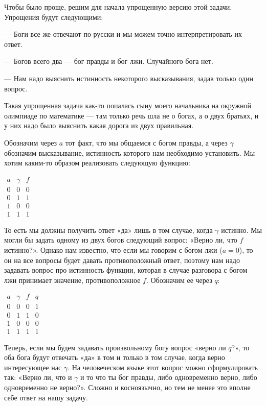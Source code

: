 Чтобы было проще, решим для начала упрощенную версию этой задачи. Упрощения будут следующими:

— Боги все же отвечают по-русски и мы можем точно интерпретировать их ответ.

— Богов всего два — бог правды и бог лжи. Случайного бога нет.

— Нам надо выяснить истинность некоторого высказывания, задав только один вопрос.

Такая упрощенная задача как-то попалась сыну моего начальника на окружной олимпиаде по математике — там только речь шла не о богах, а о двух братьях, и у них надо было выяснить какая дорога из двух правильная.

Обозначим через $a$ тот факт, что мы общаемся с богом правды, а через $\gamma$ обозначим высказывание, истинность которого нам необходимо установить. Мы хотим каким-то образом реализовать следующую функцию:

$\begin{array}{cc|c}a&\gamma&f\\ \hline 0&0&0 \\ 0&1&1 \\ 1&0&0 \\ 1&1&1 \end{array}$

То есть мы должны получить ответ «да» лишь в том случае, когда $\gamma$ истинно. Мы могли бы задать одному из двух богов следующий вопрос: «Верно ли, что $f$ истинно?». Однако нам известно, что если мы говорим с богом лжи ($a = 0$), то он на все вопросы будет давать противоположный ответ, поэтому нам надо задавать вопрос про истинность функции, которая в случае разговора с богом лжи принимает значение, противоположное $f$. Обозначим ее через $q$:

$\begin{array}{cc|cc}a&\gamma&f&q \\ \hline 0&0&0&1\\0&1&1&0\\1&0&0&0\\1&1&1&1\end{array}$

Теперь, если мы будем задавать произвольному богу вопрос «верно ли $q$?», то оба бога будут отвечать «да» в том и только в том случае, когда верно интересующее нас $\gamma$. На человеческом языке этот вопрос можно сформулировать так: «Верно ли, что и $\gamma$ и то что ты бог правды, либо одновременно верно, либо одновременно не верно?». Сложно и косноязычно, но тем не менее это вполне себе ответ на нашу задачу.

